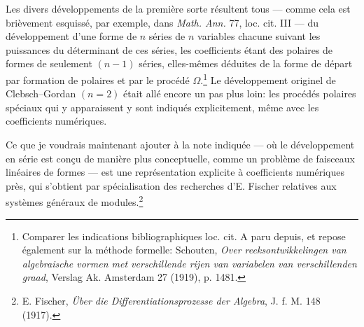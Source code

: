 Les divers développements de la première sorte résultent tous --- comme cela est brièvement esquissé, par exemple, dans \emph{Math. Ann.} 77, loc. cit. III --- du développement d'une forme de $n$ séries de $n$ variables chacune suivant les puissances du déterminant de ces séries, les coefficients étant des polaires de formes de seulement $(n-1)$ séries, elles-mêmes déduites de la forme de départ par formation de polaires et par le procédé $\Omega$.\footnote{Comparer les indications bibliographiques loc. cit. A paru depuis, et repose également sur la méthode formelle: Schouten, \emph{Over reeksontwikkelingen van algebraische vormen met verschillende rijen van variabelen van verschillenden graad}, Verslag Ak. Amsterdam 27 (1919), p. 1481.} Le développement originel de Clebsch--Gordan $(n=2)$ était allé encore un pas plus loin: les procédés polaires spéciaux qui y apparaissent y sont indiqués explicitement, même avec les coefficients numériques.

Ce que je voudrais maintenant ajouter à la note indiquée --- où le développement en série est conçu de manière plus conceptuelle, comme un problème de faisceaux linéaires de formes --- est une représentation explicite à coefficients numériques près, qui s'obtient par spécialisation des recherches d'E. Fischer relatives aux systèmes généraux de modules.\footnote{E. Fischer, \emph{Über die Differentiationsprozesse der Algebra}, J. f. M. 148 (1917).}

